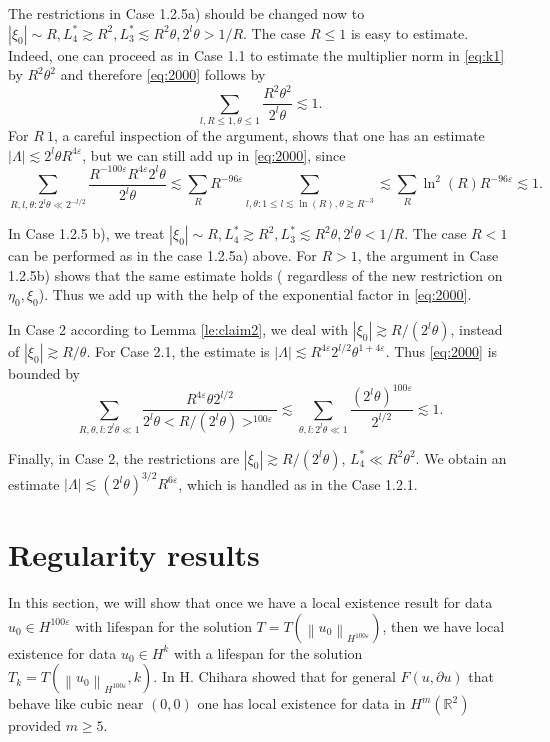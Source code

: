\documentclass[draft,11pt,leqno]{amsart}
\newcommand{\norm}[2]{{\left\| #1 \right\|}_{#2}}
\newcommand{\ve}{\varepsilon}
\newcommand{\La}{\Lambda}
\newcommand{\rtwo}{\mathbb R^2}
\newcommand{\suml}{\sum\limits}
\newcommand{\f}{\displaystyle\frac}
\newcommand{\lthree}{{L_3^{*}}}
\newcommand{\lfour}{{L_4^{*}}}
\begin{document}
The restrictions in Case 1.2.5a) should be changed now to 
$|\xi_0|\sim R, \lfour\gtrsim R^2, \lthree\lesssim 
 R^2\theta, 2^l\theta>1/R$. The case $R\leq 1$ is easy to estimate. Indeed,
one can proceed as in Case 1.1 to estimate the multiplier norm in 
\eqref{eq:k1} by $R^2\theta^2$ and therefore \eqref{eq:2000} follows by
$$
\suml_{l,R\leq 1, \theta\leq 1}\f{R^2\theta^2}{2^l\theta}\lesssim 1.
$$
For $R\>1$, a careful inspection of the argument, 
shows that one has an estimate 
$|\La|\lesssim 2^l\theta R^{4\ve}$, but we can still add up in 
\eqref{eq:2000}, since
$$
\suml_{R,l,\theta: 2^l\theta\ll2^{-l/2}} \f{R^{-100\ve}R^{4\ve}2^l\theta}
{2^l\theta}\lesssim \suml_{R} R^{-96\ve} 
\suml_{l,\theta: 1\leq l \lesssim \ln(R),\theta\gtrsim R^{-3}}\lesssim 
\suml_R \ln^2(R) R^{-96\ve}\lesssim 1.
$$

In Case 1.2.5 b), we treat $|\xi_0|\sim R, \lfour\gtrsim R^2, 
\lthree\lesssim R^2\theta, 2^l\theta<1/R$. The case $R<1$ can be performed as 
in the case 1.2.5a) above. For $R>1$, the argument in Case 1.2.5b) 
 shows that the
same estimate holds ( regardless of the new restriction on $\eta_0,\xi_0$). 
Thus we add up with the help of the exponential factor in \eqref{eq:2000}.

In Case 2 according to Lemma \ref{le:claim2}, 
we deal with $|\xi_0|\gtrsim R/(2^l\theta)$, 
instead of $|\xi_0|\gtrsim R/\theta$. 
For Case 2.1, the estimate is $|\La|\lesssim R^{4\ve}2^{l/2}\theta^{1+4\ve}$. Thus \eqref{eq:2000}
is bounded by
$$
\suml_{R,\theta,l: 2^l\theta\ll 1} \f{R^{4\ve}\theta 2^{l/2}}{2^l\theta <R/(2^l\theta)>^{100\ve}}
\lesssim \suml_{\theta,l:2^l\theta\ll 1} \f{(2^l\theta)^{100\ve}}{2^{l/2}}\lesssim 1.
$$

Finally, in Case 2, the restrictions are  $|\xi_0|\gtrsim R/(2^l\theta)$, 
$\lfour\ll R^2\theta^2$.
We obtain an estimate $|\La|\lesssim (2^{l}\theta)^{3/2}R^{6\ve}$, 
which is 
handled as in the 
Case 1.2.1.

\vspace{.5cm}

\section{Regularity results}
\label{sec:reg}

\vspace{.5cm}

In this section, we will show that once we have a local existence result
for data $u_0\in H^{100\ve}$ with lifespan for the solution 
$T=T(\norm{u_0}{H^{100\ve}})$, then we have local existence for 
data $u_0\in H^{k}$ with a lifespan for the solution 
$T_k=T(\norm{u_0}{H^{100\ve}},k)$.
In \cite{Chihara2} H. Chihara showed that for general 
$F(u, \partial u)$ that behave like cubic near $(0,0)$ one has local existence for data in $H^m(\rtwo)$ provided $m \ge 5$. 
\end{document}
